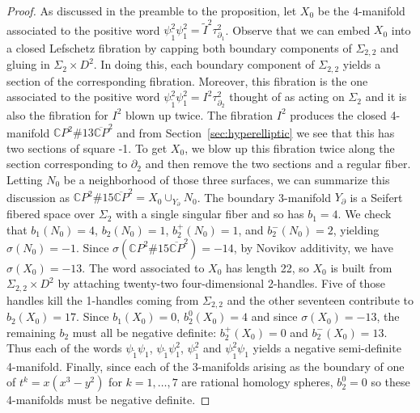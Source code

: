 \documentclass[11pt,letterpaper,reqno]{amsart}
\theoremstyle{remark}
\newcommand{\CP}{{\mathbb CP}^2}
\newcommand{\bCP}{{\overline{\mathbb CP}}^2}
\begin{document}
\begin{proof} 
As discussed in the preamble to the proposition, let $X_0$ be the 4-manifold associated to the positive word $\psi_{\tilde{1}}^2 \psi_1^2 = \tilde{I}^2 \tau_{\partial_1}^2$.
Observe that we can embed $X_0$ into a closed Lefschetz fibration by capping both boundary components of $\Sigma_{2,2}$ and gluing in $\Sigma_2 \times D^2$. In doing this, each boundary component of $\Sigma_{2,2}$ yields a section of the corresponding fibration. Moreover, this fibration is the one associated to the positive word $\psi_{\tilde{1}}^2 \psi_1^2 = I^2 \tau_{\partial_2}^2$ thought of as acting on $\Sigma_2$ and it is also the fibration for $I^2$ blown up twice. The fibration $I^2$ produces the closed 4-manifold $\CP\#13 \bCP$ and from Section~\ref{sec:hyperelliptic} we see that this has two sections of square -1. To get $X_0$, we blow up this fibration twice along the section corresponding to $\partial_2$ and then remove the two sections and a regular fiber. Letting $N_0$ be a neighborhood of those three surfaces, we can summarize this discussion as $\CP\#15 \bCP = X_0 \cup_{Y_\partial} N_0$. The boundary 3-manifold $Y_\partial$ is a Seifert fibered space over $\Sigma_2$ with a single singular fiber and so has $b_1 = 4$. We check that $b_1(N_0) = 4$, $b_2(N_0) = 1$, $b_2^+(N_0) = 1$, and $b_2^-(N_0) = 2$, yielding $\sigma(N_0) = -1$. Since $\sigma(\CP\#15 \bCP ) = -14$, by Novikov additivity, we have $\sigma(X_0) = -13.$ The word associated to $X_0$ has length 22, so $X_0$ is built from $\Sigma_{2,2}\times D^2$ by attaching twenty-two four-dimensional 2-handles. Five of those handles kill the 1-handles coming from $\Sigma_{2,2}$ and the other seventeen contribute to $b_2(X_0) = 17.$ Since $b_1(X_0) = 0$, $b_2^0(X_0) = 4$ and since $\sigma(X_0) = -13$, the remaining $b_2$ must all be negative definite: $b_2^+(X_0)=0$ and $b_2^{-}(X_0)=13$. Thus each of the words $\psi_{\tilde{1}} \psi_1$, $\psi_{\tilde{1}} \psi_1^2$, $\psi_{\tilde{1}}^2$ and $\psi_{\tilde{1}}^2 \psi_1$ yields a negative semi-definite 4-manifold. Finally, since each of the 3-manifolds arising as the boundary of one of $t^k = x(x^3 - y^2)$ for $k=1,\dots,7$ are rational homology spheres, $b_2^0=0$ so these 4-manifolds must be negative definite.
\end{proof}


















\vspace{0.3in}
\end{document}
